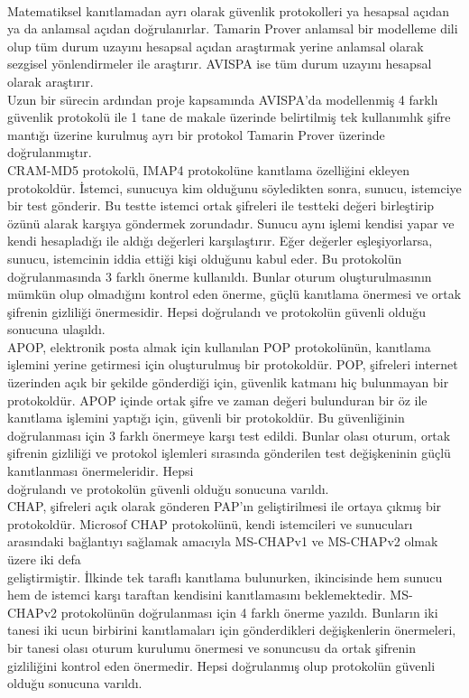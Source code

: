 \documentclass[a4paper, 12pt, titlepage]{article}
\begin{document}
\bigskip
\\ Matematiksel kanıtlamadan ayrı olarak güvenlik protokolleri ya hesapsal açıdan ya da anlamsal açıdan doğrulanırlar. Tamarin Prover anlamsal bir modelleme dili olup tüm durum uzayını hesapsal açıdan araştırmak yerine anlamsal olarak sezgisel yönlendirmeler ile araştırır. AVISPA ise tüm durum uzayını hesapsal olarak araştırır.
\bigskip
\\Uzun bir sürecin ardından proje kapsamında AVISPA'da modellenmiş 4 farklı güvenlik protokolü ile 1 tane de makale üzerinde belirtilmiş tek kullanımlık şifre mantığı üzerine kurulmuş ayrı bir protokol Tamarin Prover üzerinde doğrulanmıştır.
\bigskip
\\ CRAM-MD5 protokolü, IMAP4 protokolüne kanıtlama özelliğini ekleyen protokoldür. İstemci, sunucuya kim olduğunu söyledikten sonra, sunucu, istemciye bir test gönderir. Bu testte istemci ortak şifreleri ile testteki değeri birleştirip özünü alarak karşıya göndermek zorundadır. Sunucu aynı işlemi kendisi yapar ve kendi hesapladığı ile aldığı değerleri karşılaştırır. Eğer değerler eşleşiyorlarsa, sunucu, istemcinin iddia ettiği kişi olduğunu kabul eder. Bu protokolün doğrulanmasında 3 farklı önerme kullanıldı. Bunlar oturum oluşturulmasının mümkün olup olmadığını kontrol eden önerme, güçlü kanıtlama önermesi ve ortak şifrenin gizliliği önermesidir. Hepsi doğrulandı ve protokolün güvenli olduğu sonucuna ulaşıldı.
\bigskip
\\ APOP, elektronik posta almak için kullanılan POP protokolünün, kanıtlama işlemini yerine getirmesi için oluşturulmuş bir protokoldür. POP, şifreleri internet üzerinden açık bir şekilde gönderdiği için, güvenlik katmanı hiç bulunmayan bir protokoldür. APOP içinde ortak şifre ve zaman değeri bulunduran bir öz ile kanıtlama işlemini yaptığı için, güvenli bir protokoldür. Bu güvenliğinin doğrulanması için 3 farklı önermeye karşı test edildi. Bunlar olası oturum, ortak şifrenin gizliliği ve protokol işlemleri sırasında gönderilen test değişkeninin güçlü kanıtlanması önermeleridir. Hepsi \\doğrulandı ve protokolün güvenli olduğu sonucuna varıldı.
\bigskip
\\ CHAP, şifreleri açık olarak gönderen PAP'ın geliştirilmesi ile ortaya çıkmış bir protokoldür. Microsof CHAP protokolünü, kendi istemcileri ve sunucuları arasındaki bağlantıyı sağlamak amacıyla MS-CHAPv1 ve MS-CHAPv2 olmak üzere iki defa \\geliştirmiştir. İlkinde tek taraflı kanıtlama bulunurken, ikincisinde hem sunucu hem de istemci karşı taraftan kendisini kanıtlamasını beklemektedir. MS-CHAPv2 protokolünün doğrulanması için 4 farklı önerme yazıldı. Bunların iki tanesi iki ucun birbirini kanıtlamaları için gönderdikleri değişkenlerin önermeleri, bir tanesi olası oturum kurulumu önermesi ve sonuncusu da ortak şifrenin gizliliğini kontrol eden önermedir. Hepsi doğrulanmış olup protokolün güvenli olduğu sonucuna varıldı.
\end{document}
